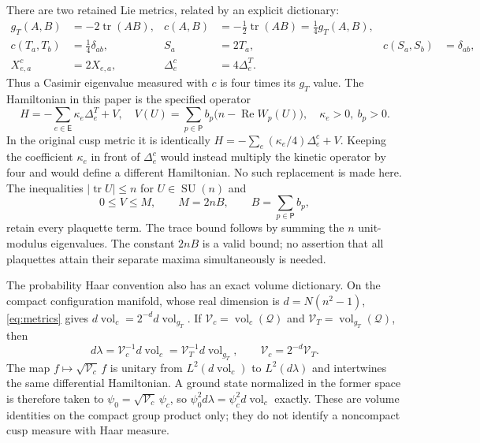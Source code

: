 \documentclass[11pt]{article}
\theoremstyle{definition}
\newcommand{\tr}{\operatorname{tr}}
\newcommand{\SU}{\operatorname{SU}}
\newcommand{\Rea}{\operatorname{Re}}
\begin{document}
There are two retained Lie metrics, related by an explicit dictionary:
\begin{align}
 g_T(A,B)&=-2\tr(AB),&
 c(A,B)&=-\tfrac12\tr(AB)=\tfrac14g_T(A,B),\label{eq:metrics}\\
 c(T_a,T_b)&=\tfrac14\delta_{ab},&
 S_a&=2T_a,& c(S_a,S_b)&=\delta_{ab},\nonumber\\
 X^c_{e,a}&=2X_{e,a},&
 \Delta_e^c&=4\Delta_e^T.\label{eq:metric-laplace}
\end{align}
Thus a Casimir eigenvalue measured with $c$ is four times its $g_T$ value.
The Hamiltonian in this paper is the specified operator
\begin{equation}\label{eq:H}
 H=-\sum_{e\in\mathsf E}\kappa_e\Delta_e^T+V,
 \quad
 V(U)=\sum_{p\in\mathsf P}b_p\bigl(n-\Rea W_p(U)\bigr),
 \quad \kappa_e>0,\ b_p>0.
\end{equation}
In the original cusp metric it is identically
$H=-\sum_e(\kappa_e/4)\Delta_e^c+V$.
Keeping the coefficient $\kappa_e$ in front of $\Delta_e^c$ would instead
multiply the kinetic operator by four and would define a different
Hamiltonian. No such replacement is made here. The inequalities
$|\tr U|\leq n$ for $U\in\SU(n)$ and
\begin{equation}\label{eq:Vbounds}
 0\leq V\leq M,\qquad
 M=2nB,\qquad B=\sum_{p\in\mathsf P}b_p,
\end{equation}
retain every plaquette term. The trace bound follows by summing the $n$
unit-modulus eigenvalues. The constant $2nB$ is a valid bound; no assertion
that all plaquettes attain their separate maxima simultaneously is needed.

The probability Haar convention also has an exact volume dictionary.
On the compact configuration manifold, whose real dimension is
$d=N(n^2-1)$, \eqref{eq:metrics} gives
$d\operatorname{vol}_c=2^{-d}d\operatorname{vol}_{g_T}$.
If $\mathcal V_c=\operatorname{vol}_c(\mathcal Q)$ and
$\mathcal V_T=\operatorname{vol}_{g_T}(\mathcal Q)$, then
\[
 d\lambda=\mathcal V_c^{-1}d\operatorname{vol}_c
         =\mathcal V_T^{-1}d\operatorname{vol}_{g_T},\qquad
 \mathcal V_c=2^{-d}\mathcal V_T.
\]
The map $f\mapsto\sqrt{\mathcal V_c}\,f$ is unitary from
$L^2(d\operatorname{vol}_c)$ to $L^2(d\lambda)$ and intertwines the same
differential Hamiltonian. A ground state normalized in the former
space is therefore taken to $\psi_0=\sqrt{\mathcal V_c}\,\psi_c$, so
$\psi_0^2d\lambda=\psi_c^2d\operatorname{vol}_c$ exactly. These are
volume identities on the compact group product only; they do not
identify a noncompact cusp measure with Haar measure.
\end{document}
